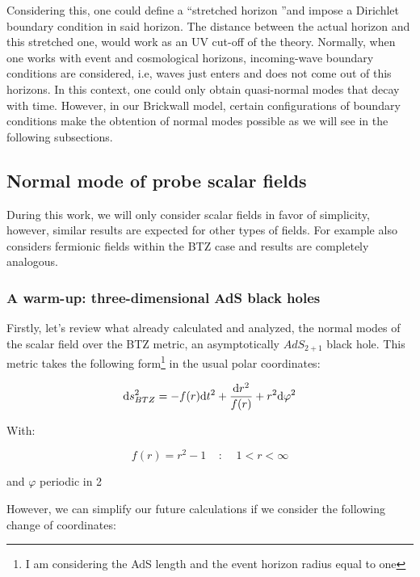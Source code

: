 \documentclass[11pt,a4paper]{article}
\begin{document}
Considering this, one could define a \textquotedblleft stretched horizon \textquotedblright and impose a Dirichlet boundary condition in said horizon. The distance between the actual horizon and this stretched one, would work as an UV cut-off of the theory. Normally, when one works with event and cosmological horizons, incoming-wave boundary conditions are considered, i.e, waves just enters and does not come out of this horizons. In this context, one could only obtain quasi-normal modes that decay with time. However, in our Brickwall model, certain configurations of boundary conditions make the obtention of normal modes possible as we will see in the following subsections.

\subsection{Normal mode of probe scalar fields}

During this work, we will only consider scalar fields in favor of simplicity, however, similar results are expected for other types of fields. For example \cite{Jeong_2025} also considers fermionic fields within the BTZ case and results are completely analogous.

\subsubsection{A warm-up: three-dimensional AdS black holes}

Firstly, let's review what \cite{Jeong_2025,Das_2023,das2023fuzzballsrandommatrices} already calculated and analyzed, the normal modes of the scalar field over the BTZ metric, an asymptotically $AdS_{2+1}$ black hole. This metric takes the following form\footnote{I am considering the AdS length and the event horizon radius equal to one} in the usual polar coordinates:

\begin{equation}\LA{BTZ_METRIC}
    \dd s^2_{BTZ} = -f(r)\dd t^2 + \frac{\dd r^2}{f(r)} + r^2 \dd\varphi^2
\end{equation}

{\noindent With:}

\begin{equation}
    f(r) = r^2 - 1 ~~~~~:~~~~~ 1 < r < \infty
\end{equation}

{\noindent and $\varphi$ periodic in 2\pi}

However, we can simplify our future calculations if we consider the following change of coordinates:
\end{document}
